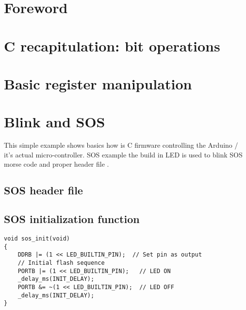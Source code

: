 
\section{Foreword}

\section{C recapitulation: bit operations}

\section{Basic register manipulation}

\newpage
\section{Blink and SOS}
This simple example shows basics how is C firmware controlling the Arduino / it's actual micro-controller. SOS example the build in LED is used to blink SOS morse code and proper header file .

\subsection{SOS header file}

\newpage

\subsection{SOS initialization function}
\begin{lstlisting}[caption=sos.c - sos\_init()]
void sos_init(void)
{
    DDRB |= (1 << LED_BUILTIN_PIN);  // Set pin as output
    // Initial flash sequence
    PORTB |= (1 << LED_BUILTIN_PIN);   // LED ON
    _delay_ms(INIT_DELAY);
    PORTB &= ~(1 << LED_BUILTIN_PIN);  // LED OFF
    _delay_ms(INIT_DELAY);
}
\end{lstlisting}